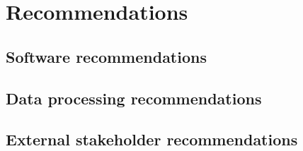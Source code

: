 \chapter{Recommendations}
\section{Software recommendations}

\section{Data processing recommendations}

\section{External stakeholder recommendations}